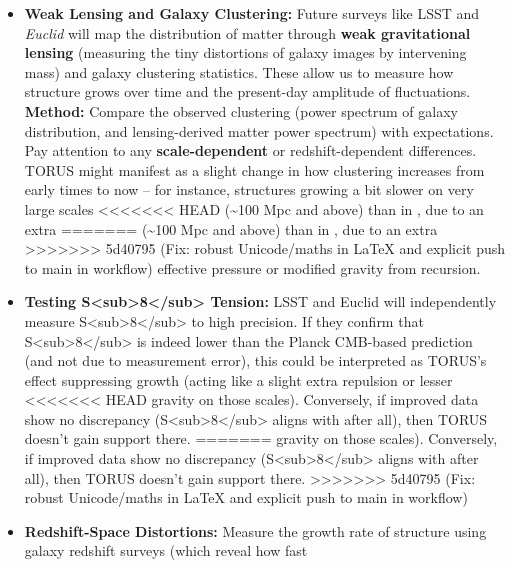 \documentclass[]{article}
\begin{document}
{\begin{itemize}
  \begin{itemize}
  \item
    \textbf{Weak Lensing and Galaxy Clustering:} Future surveys like
    LSST and \emph{Euclid} will map the distribution of matter through
    \textbf{weak gravitational lensing} (measuring the tiny distortions
    of galaxy images by intervening mass) and galaxy clustering
    statistics. These allow us to measure how structure grows over time
    and the present-day amplitude of fluctuations. \textbf{Method:}
    Compare the observed clustering (power spectrum of galaxy
    distribution, and lensing-derived matter power spectrum) with \LambdaCDM
    expectations. Pay attention to any \textbf{scale-dependent} or
    redshift-dependent differences. TORUS might manifest as a slight
    change in how clustering increases from early times to now -- for
    instance, structures growing a bit slower on very large scales
<<<<<<< HEAD
    (\textasciitilde100 Mpc and above) than in \LambdaCDM, due to an extra
=======
    (\textasciitilde{}100 Mpc and above) than in \LambdaCDM, due to an extra
>>>>>>> 5d40795 (Fix: robust Unicode/maths in LaTeX and explicit push to main in workflow)
    effective pressure or modified gravity from recursion.
  \item
    \textbf{Testing
    S\textless{}sub\textgreater{}8\textless{}/sub\textgreater{}
    Tension:} LSST and Euclid will independently measure
    S\textless{}sub\textgreater{}8\textless{}/sub\textgreater{} to high
    precision. If they confirm that
    S\textless{}sub\textgreater{}8\textless{}/sub\textgreater{} is
    indeed lower than the Planck CMB-based prediction (and not due to
    measurement error), this could be interpreted as TORUS's effect
    suppressing growth (acting like a slight extra repulsion or lesser
<<<<<<< HEAD
    gravity on those scales)\hspace{0pt}. Conversely, if improved data
    show no discrepancy
    (S\textless sub\textgreater8\textless/sub\textgreater{} aligns with
    \LambdaCDM after all), then TORUS doesn't gain support there.
=======
    gravity on those scales)​. Conversely, if improved data show no
    discrepancy
    (S\textless{}sub\textgreater{}8\textless{}/sub\textgreater{} aligns
    with \LambdaCDM after all), then TORUS doesn't gain support there.
>>>>>>> 5d40795 (Fix: robust Unicode/maths in LaTeX and explicit push to main in workflow)
  \item
    \textbf{Redshift-Space Distortions:} Measure the growth rate of
    structure using galaxy redshift surveys (which reveal how fast

\end{itemize}
\end{itemize}}
\end{document}
